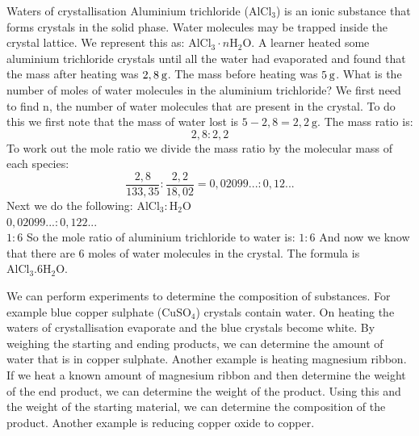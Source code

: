     \noindent
\par
            \label{m38712*eid672431}\vspace{-3cm} 
      \noindent
      \begin{wex}{Waters of crystallisation}{
\label{m38712*pid47982}
\label{m38712*id64827}Aluminium trichloride (${\text{AlCl}}_{3}$) is an ionic substance that forms crystals in the solid phase. Water molecules may be trapped inside the crystal lattice. We represent this as: ${\text{AlCl}}_{3}\ensuremath{\cdot}n{\text{H}}_{2}\text{O}$. A learner heated some aluminium trichloride crystals until all the water had evaporated and found that the mass after heating was $2,8\phantom{\rule{2pt}{0ex}}\text{g}$. The mass before heating was $5\phantom{\rule{2pt}{0ex}}\text{g}$. What is the number of moles of water molecules in the aluminium trichloride?
\vspace{5pt}}
{
We first need to find n, the number of water molecules that are present in the crystal. To do this we first note that the mass of water lost is $5-2,8=2,2~\text{g}$.
  \label{m38712*id3892}The mass ratio is:
 \label{m38712*eid744672}\nopagebreak\noindent{}
    \begin{equation*}
    2,8:2,2
      \end{equation*}
To work out the mole ratio we divide the mass ratio by the molecular mass of each species:
\label{m38712*eid7459432}\nopagebreak\noindent{}
    \begin{equation*}
    \frac{2,8}{133,35}:\frac{2,2}{18,02}=0,02099...:0,12...
      \end{equation*}
Next we do the following:
$\text{AlCl}_{3}:\text{H}_{2}\text{O}$\\
$0,02099...:0,122...$ \\
$1:6$
So the mole ratio of aluminium trichloride to water is: $1:6$
And now we know that there are 6 moles of water molecules in the crystal. The formula is $\text{AlCl}_{3}.6\text{H}_{2}\text{O}$.
}
    \end{wex}
We can perform experiments to determine the composition of substances. For example blue copper sulphate ($\text{CuSO}_{4}$) crystals contain water. On heating the waters of crystallisation evaporate and the blue crystals become white. By weighing the starting and ending products, we can determine the amount of water that is in copper sulphate. Another example is heating magnesium ribbon. If we heat a known amount of magnesium ribbon and then determine the weight of the end product, we can determine the weight of the product. Using this and the weight of the starting material, we can determine the composition of the product. Another example is reducing copper oxide to copper. 

